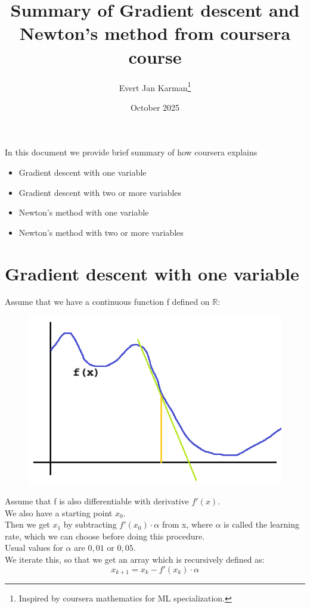 \documentclass[12pt, letterpaper]{article}
\title{Summary of Gradient descent and Newton's method from coursera course}
\author{Evert Jan Karman\thanks{Inspired by coursera mathematics for ML specialization.}}
\date{October 2025}
\begin{document}
\maketitle

In this document we provide brief summary of how coursera explains
\begin{itemize}
    \item Gradient descent with one variable
    \item Gradient descent with two or more variables
    \item Newton's method with one variable
    \item Newton's method with two or more variables
\end{itemize}

\section{Gradient descent with one variable}

Assume that we have a continuous function f defined on $\mathbb{R}$:

\begin{figure}[H]
    \includegraphics{fx_example_01.png}
\end{figure}
Assume that f is also differentiable with derivative $f'(x)$.\\
We also have a starting point $x_0$.\\
Then we get $x_1$ by subtracting $f'(x_0) \cdot \alpha$ from x, where $\alpha$ is called the learning rate, which we can choose before doing this procedure.\\
Usual values for $\alpha$ are $0,01$ or $0,05$.\\
We iterate this, so that we get an array which is recursively defined as:\\
\[x_{k+1} = x_k - f'(x_k) \cdot \alpha\]
\end{document}
